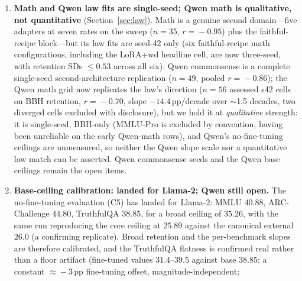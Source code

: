 \documentclass[11pt]{article}
\begin{document}
\begin{enumerate}
        and there \emph{only} as a qualitative fingerprint---explicitly labelled as
        excluded from every quantitative law/table claim---never as an assessed
        on/off-curve result. Because CorDA is arguably the most important adapter for
        the ``geometry adds nothing beyond magnitude'' claim, its absence from the
        quantitative set is a real gap: the study assesses seven of its eight
        adapters, six of them on-curve, not all eight.
  \item \textbf{Math and Qwen law fits are single-seed; Qwen math is
        qualitative, not quantitative} (Section~\ref{sec:law}). Math is a
        genuine second domain---five adapters
        at seven rates on the sweep ($n\!=\!35$, $r\!=\!-0.95$) plus the
        faithful-recipe block---but its law fits are seed-42 only (six
        faithful-recipe math configurations, including the LoRA{+}wd headline
        cell, are now three-seed, with retention SDs $\le\!0.53$ across all
        six). Qwen commonsense is a complete
        single-seed second-architecture replication ($n\!=\!49$, pooled
        $r\!=\!-0.86$); the Qwen math grid now replicates the law's direction
        ($n\!=\!56$ assessed s42 cells on BBH retention, $r\!=\!-0.70$, slope
        $-14.4$\,pp/decade over $\sim$1.5 decades, two diverged cells excluded
        with disclosure), but we hold it at \emph{qualitative} strength: it is
        single-seed, BBH-only (MMLU-Pro is excluded by convention, having been
        unreliable on the early Qwen-math rows), and Qwen's no-fine-tuning
        ceilings are unmeasured, so neither the Qwen slope scale nor a
        quantitative law match can be asserted. Qwen commonsense seeds and the
        Qwen base ceilings remain the open items.
  \item \textbf{Base-ceiling calibration: landed for Llama-2; Qwen still open.}
        The no-fine-tuning evaluation (C5) has landed for Llama-2: MMLU
        $40.88$, ARC-Challenge $44.80$, TruthfulQA $38.85$, for a broad ceiling
        of $35.26$, with the same run reproducing the core ceiling at $25.89$
        against the canonical external $26.0$ (a confirming replicate). Broad
        retention and the per-benchmark slopes are therefore calibrated, and
        the TruthfulQA flatness is confirmed real rather than a floor artifact
        (fine-tuned values $31.4$--$39.5$ against base $38.85$: a constant
        $\approx\!-3$\,pp fine-tuning offset, magnitude-independent;

\end{enumerate}
\end{document}
